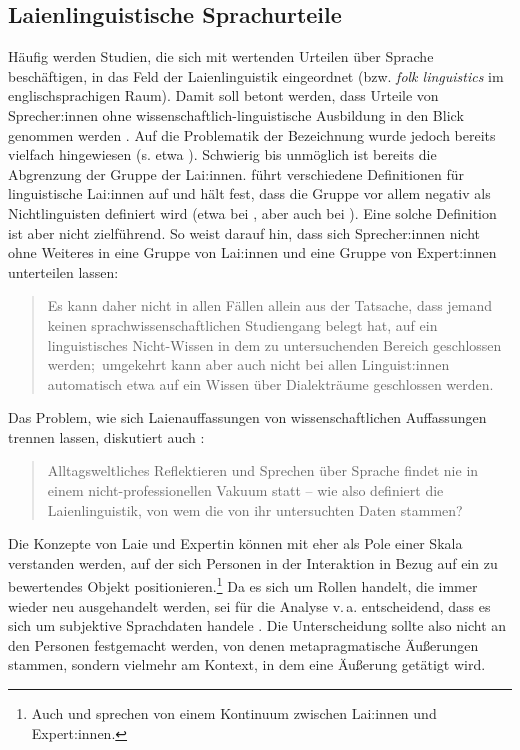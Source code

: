 \subsection{Laienlinguistische Sprachurteile}
\label{sec:Laienlinguistik}
Häufig werden Studien, die sich mit wertenden Urteilen über Sprache beschäftigen, in das Feld der Laienlinguistik eingeordnet (bzw. \textit{folk linguistics} im englischsprachigen Raum). 
Damit soll betont werden, dass Urteile von Sprecher:innen ohne wissenschaftlich-linguistische Ausbildung in den Blick genommen werden \citep[s.][25--26]{Antos1996}. 
Auf die Problematik der Bezeichnung wurde jedoch bereits vielfach hingewiesen (s. etwa \cites{Cuonz.2014}{Konig.2014}[396]{Moschonas2014}[320]{Spitzmuller2014}). 
Schwierig bis unmöglich ist bereits die Abgrenzung der Gruppe der Lai:innen. 
\citet[11--12]{Konig.2014} f{\"u}hrt verschiedene Definitionen f{\"u}r linguistische Lai:innen auf und h{\"a}lt fest, dass die Gruppe vor allem negativ als {\glqq}Nichtlinguisten{\grqq} definiert wird (etwa bei \citealp[179]{Garrett.2012}, aber auch bei \citealp[8]{Hennig2016}). 
Eine solche Definition ist aber nicht zielführend. 
So weist \citet{Konig.2014} darauf hin, dass sich Sprecher:innen nicht ohne Weiteres in eine Gruppe von Lai:innen und eine Gruppe von Expert:innen unterteilen lassen:
\begin{quote}Es kann daher nicht in allen F{\"a}llen allein aus der Tatsache, dass jemand keinen sprachwissenschaftlichen Studiengang belegt hat, auf ein linguistisches Nicht-Wissen in dem zu untersuchenden Bereich geschlossen werden;~umgekehrt kann aber auch nicht bei allen Linguist:innen automatisch etwa auf ein Wissen {\"u}ber Dialektr{\"a}ume geschlossen werden.~\citep[12--13]{Konig.2014}\end{quote}
Das Problem, wie sich Laienauffassungen von wissenschaftlichen Auffassungen trennen lassen, diskutiert auch \citeauthor{Cuonz.2014}:\begin{quote}Alltagsweltliches Reflektieren und Sprechen {\"u}ber Sprache findet nie in einem nicht-professionellen Vakuum statt -- wie also definiert die Laienlinguistik, von wem die von ihr untersuchten Daten stammen?~\citep[12--13]{Cuonz.2014}\end{quote}
Die Konzepte von Laie und Expertin k{\"o}nnen mit \citet[14--15]{Konig.2014} eher als Pole einer Skala verstanden werden, auf der sich Personen in der Interaktion in Bezug auf ein zu bewertendes Objekt positionieren.\footnote{Auch \citet[13]{Cuonz.2014} und \citet[320]{Spitzmuller2014} sprechen von einem Kontinuum zwischen Lai:innen und Expert:innen.} 
Da es sich um Rollen handelt, die immer wieder neu ausgehandelt werden, sei f{\"u}r die Analyse v.\,a. entscheidend, dass es sich um {\glqq}subjektive Sprachdaten{\grqq} handele \citep[15]{Konig.2014}. 
Die Unterscheidung sollte also nicht an den Personen festgemacht werden, von denen metapragmatische Äußerungen stammen, sondern vielmehr am Kontext, in dem eine Äußerung getätigt wird. 

